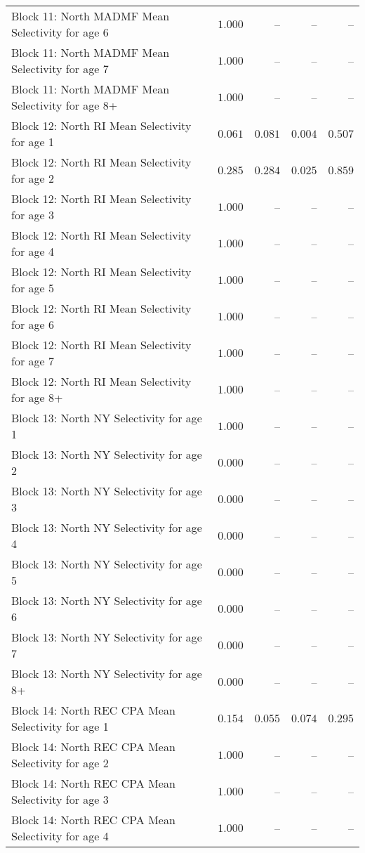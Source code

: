 \documentclass[
]{article}
\begin{document}
\begin{landscape}
\begin{longtable}[t]{lrrrr}
Block 11: North MADMF Mean Selectivity for age 6 & $1.000$ & -- & -- & --\\
Block 11: North MADMF Mean Selectivity for age 7 & $1.000$ & -- & -- & --\\
Block 11: North MADMF Mean Selectivity for age 8+ & $1.000$ & -- & -- & --\\
\addlinespace
Block 12: North RI Mean Selectivity for age 1 & $0.061$ & $0.081$ & $0.004$ & $0.507$\\
Block 12: North RI Mean Selectivity for age 2 & $0.285$ & $0.284$ & $0.025$ & $0.859$\\
Block 12: North RI Mean Selectivity for age 3 & $1.000$ & -- & -- & --\\
Block 12: North RI Mean Selectivity for age 4 & $1.000$ & -- & -- & --\\
Block 12: North RI Mean Selectivity for age 5 & $1.000$ & -- & -- & --\\
\addlinespace
Block 12: North RI Mean Selectivity for age 6 & $1.000$ & -- & -- & --\\
Block 12: North RI Mean Selectivity for age 7 & $1.000$ & -- & -- & --\\
Block 12: North RI Mean Selectivity for age 8+ & $1.000$ & -- & -- & --\\
Block 13: North NY Selectivity for age 1 & $1.000$ & -- & -- & --\\
Block 13: North NY Selectivity for age 2 & $0.000$ & -- & -- & --\\
\addlinespace
Block 13: North NY Selectivity for age 3 & $0.000$ & -- & -- & --\\
Block 13: North NY Selectivity for age 4 & $0.000$ & -- & -- & --\\
Block 13: North NY Selectivity for age 5 & $0.000$ & -- & -- & --\\
Block 13: North NY Selectivity for age 6 & $0.000$ & -- & -- & --\\
Block 13: North NY Selectivity for age 7 & $0.000$ & -- & -- & --\\
\addlinespace
Block 13: North NY Selectivity for age 8+ & $0.000$ & -- & -- & --\\
Block 14: North REC CPA Mean Selectivity for age 1 & $0.154$ & $0.055$ & $0.074$ & $0.295$\\
Block 14: North REC CPA Mean Selectivity for age 2 & $1.000$ & -- & -- & --\\
Block 14: North REC CPA Mean Selectivity for age 3 & $1.000$ & -- & -- & --\\
Block 14: North REC CPA Mean Selectivity for age 4 & $1.000$ & -- & -- & --\\

\end{longtable}
\end{landscape}
\end{document}
